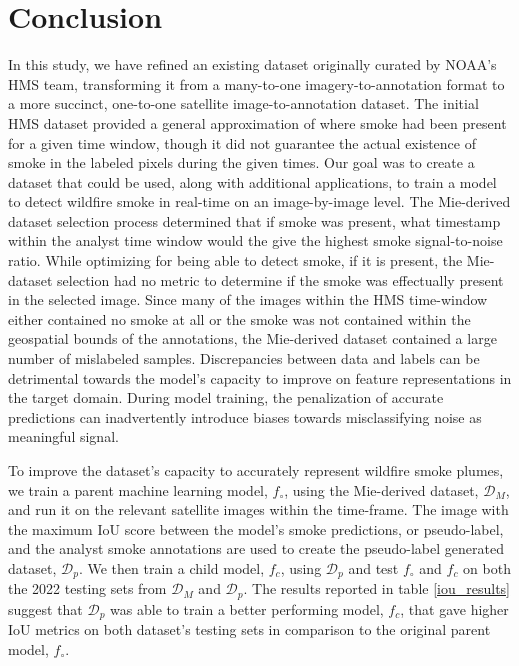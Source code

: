 \documentclass{article}
\begin{document}
\section{Conclusion}

In this study, we have refined an existing dataset originally curated by NOAA's HMS team, transforming it from a many-to-one imagery-to-annotation format to a more succinct, one-to-one satellite image-to-annotation dataset. The initial HMS dataset provided a general approximation of where smoke had been present for a given time window, though it did not guarantee the actual existence of smoke in the labeled pixels during the given times. Our goal was to create a dataset that could be used, along with additional applications, to train a model to detect wildfire smoke in real-time on an image-by-image level. The Mie-derived dataset selection process determined that if smoke was present, what timestamp within the analyst time window would the give the highest smoke signal-to-noise ratio. While optimizing for being able to detect smoke, if it is present, the Mie-dataset selection had no metric to determine if the smoke was effectually present in the selected image. Since many of the images within the HMS time-window either contained no smoke at all or the smoke was not contained within the geospatial bounds of the annotations, the Mie-derived dataset contained a large number of mislabeled samples. Discrepancies between data and labels can be detrimental towards the model's capacity to improve on feature representations in the target domain. During model training, the penalization of accurate predictions can inadvertently introduce biases towards misclassifying noise as meaningful signal. 

To improve the dataset's capacity to accurately represent wildfire smoke plumes, we train a parent machine learning model, \(f_{\circ}\), using the Mie-derived dataset, \(\mathcal{D}_M\), and run it on the relevant satellite images within the time-frame. The image with the maximum IoU score between the model's smoke predictions, or pseudo-label, and the analyst smoke annotations are used to create the pseudo-label generated dataset, \(\mathcal{D}_{p}\). We then train a child model, \(f_c\), using \(\mathcal{D}_{p}\) and test \(f_{\circ}\) and \(f_c\) on both the 2022 testing sets from \(\mathcal{D}_{M}\) and \(\mathcal{D}_{p}\). The results reported in table \ref{iou_results} suggest that \(\mathcal{D}_{p}\) was able to train a better performing model, \(f_c\), that gave higher IoU metrics on both dataset's testing sets in comparison to the original parent model, \(f_{\circ}\).
\end{document}

